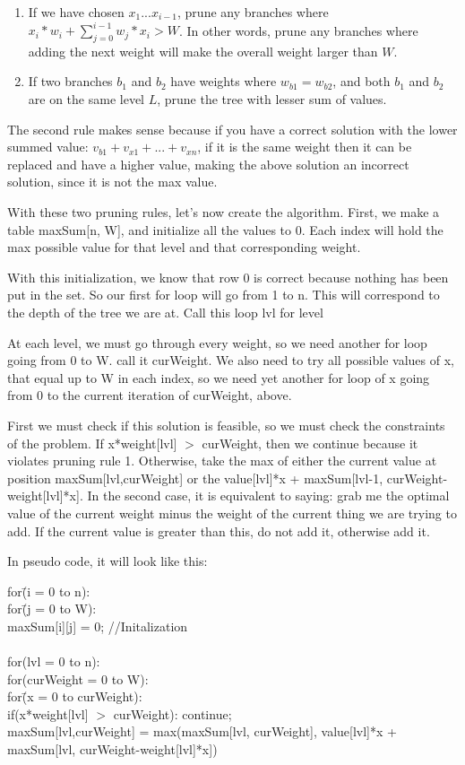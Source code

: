\documentclass{article}
\begin{document}
\begin{enumerate}
\begin{enumerate}
\item If we have chosen $x_1 ... x_{i-1}$, prune any branches where $x_i * w_i + \sum\limits_{j=0}^{i-1}w_{j}*x_{i} > W$. In other words, prune any branches where adding the next weight will make the overall weight larger than $W$.
\item If two branches $b_1$ and $b_2$ have weights where $w_{b1} = w_{b2}$, and both $b_1$ and $b_2$ are on the same level $L$, prune the tree with lesser sum of values.
\end{enumerate}

The second rule makes sense because if you have a correct solution with the lower summed value: $v_{b1} + v_{x1}+...+v_{xn}$, if it is the same weight then it can be replaced and have a higher value, making the above solution an incorrect solution, since it is not the max value.

With these two pruning rules, let's now create the algorithm. First, we make a table maxSum[n, W], and initialize all the values to 0. Each index will hold the max possible value for that level and that corresponding weight. 

With this initialization, we know that row 0 is correct because nothing has been put in the set. So our first for loop will go from 1 to n. This will correspond to the depth of the tree we are at. Call this loop lvl for level

At each level, we must go through every weight, so we need another for loop going from 0 to W. call it curWeight. We also need to try all possible values of x, that equal up to W in each index, so we need yet another for loop of x going from 0 to the current iteration of curWeight, above.

First we must check if this solution is feasible, so we must check the constraints of the problem. If  x*weight[lvl] $>$ curWeight, then we continue because it violates pruning rule 1. Otherwise, take the max of either the current value at position maxSum[lvl,curWeight] or the value[lvl]*x + maxSum[lvl-1, curWeight-weight[lvl]*x]. In the second case, it is equivalent to saying: grab me the optimal value of the current weight minus the weight of the current thing we are trying to add. If the current value is greater than this, do not add it, otherwise add it. 

In pseudo code, it will look like this:
 
\begin{tabbing}
for\=(i = 0 to n):\\
\>for\=(j = 0 to W):\\
\>\>maxSum[i][j] = 0; //Initalization \\
\\
for(lvl = 0 to n):\\
\>for(curWeight = 0 to W):\\
\>\>for\=(x = 0 to curWeight):\\
\>\>\>if(x*weight[lvl] $>$ curWeight): continue;\\
\>\>\>maxSum[lvl,curWeight] = max(maxSum[lvl, curWeight], value[lvl]*x + maxSum[lvl, curWeight-weight[lvl]*x])\\
\end{tabbing}


\end{enumerate}
\end{document}
